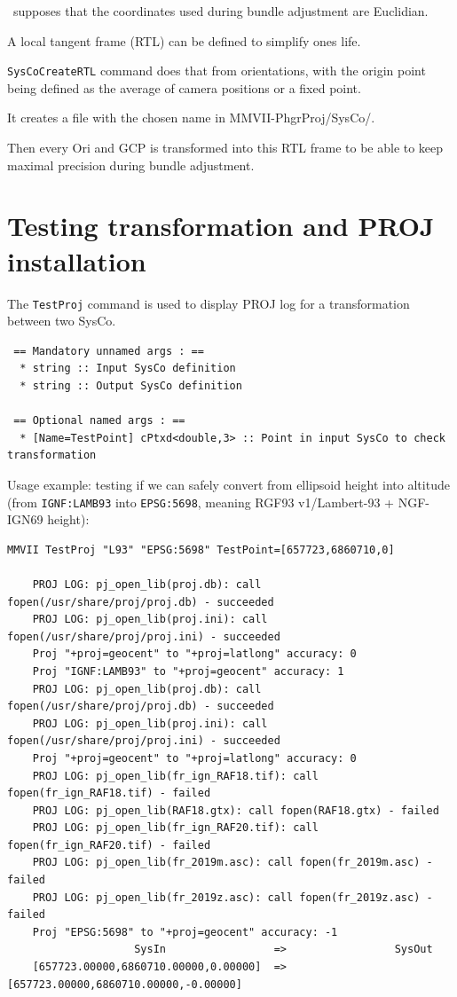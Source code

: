 \CdPPP\ supposes that the coordinates used during bundle adjustment are Euclidian.

A local tangent frame (RTL) can be defined to simplify ones life. 

{\tt SysCoCreateRTL} command does that from orientations, with the origin point being defined as the average of camera positions or a fixed point.

It creates a file with the chosen name in {MMVII-PhgrProj/SysCo/}.

Then every Ori and GCP is transformed into this RTL frame to be able to keep maximal precision during bundle adjustment.


\section{Testing transformation and PROJ installation}
The {\tt TestProj} command is used to display PROJ log for a transformation between two SysCo.

\begin{verbatim}
 == Mandatory unnamed args : ==
  * string :: Input SysCo definition
  * string :: Output SysCo definition

 == Optional named args : ==
  * [Name=TestPoint] cPtxd<double,3> :: Point in input SysCo to check transformation
\end{verbatim}

Usage example: testing if we can safely convert from ellipsoid height into altitude
(from {\tt IGNF:LAMB93} into {\tt EPSG:5698}, meaning RGF93 v1/Lambert-93 + NGF-IGN69 height):

\begin{verbatim}
MMVII TestProj "L93" "EPSG:5698" TestPoint=[657723,6860710,0]

    PROJ LOG: pj_open_lib(proj.db): call fopen(/usr/share/proj/proj.db) - succeeded
    PROJ LOG: pj_open_lib(proj.ini): call fopen(/usr/share/proj/proj.ini) - succeeded
    Proj "+proj=geocent" to "+proj=latlong" accuracy: 0
    Proj "IGNF:LAMB93" to "+proj=geocent" accuracy: 1
    PROJ LOG: pj_open_lib(proj.db): call fopen(/usr/share/proj/proj.db) - succeeded
    PROJ LOG: pj_open_lib(proj.ini): call fopen(/usr/share/proj/proj.ini) - succeeded
    Proj "+proj=geocent" to "+proj=latlong" accuracy: 0
    PROJ LOG: pj_open_lib(fr_ign_RAF18.tif): call fopen(fr_ign_RAF18.tif) - failed
    PROJ LOG: pj_open_lib(RAF18.gtx): call fopen(RAF18.gtx) - failed
    PROJ LOG: pj_open_lib(fr_ign_RAF20.tif): call fopen(fr_ign_RAF20.tif) - failed
    PROJ LOG: pj_open_lib(fr_2019m.asc): call fopen(fr_2019m.asc) - failed
    PROJ LOG: pj_open_lib(fr_2019z.asc): call fopen(fr_2019z.asc) - failed
    Proj "EPSG:5698" to "+proj=geocent" accuracy: -1
                    SysIn                 =>                 SysOut                
    [657723.00000,6860710.00000,0.00000]  =>  [657723.00000,6860710.00000,-0.00000]
\end{verbatim}

